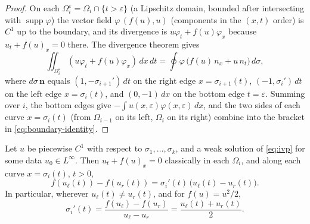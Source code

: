 \begin{proof}
On each $\Omega_i^\varepsilon=\Omega_i\cap\{t>\varepsilon\}$ (a Lipschitz
domain, bounded after intersecting with $\operatorname{supp}\varphi$) the
vector field $\varphi\,(f(u),u)$ (components in the $(x,t)$ order) is $C^1$ up
to the boundary, and its divergence is $u\varphi_t+f(u)\varphi_x$ because
$u_t+f(u)_x=0$ there. The divergence theorem gives
\begin{equation*}
  \iint_{\Omega_i^\varepsilon}(u\varphi_t+f(u)\varphi_x)\,dx\,dt
  = \oint \varphi\,\big(f(u)\,n_x+u\,n_t\big)\,d\sigma ,
\end{equation*}
where $d\sigma\,\mathbf n$ equals $(1,-\sigma_{i+1}')\,dt$ on the right edge
$x=\sigma_{i+1}(t)$, $(-1,\sigma_i')\,dt$ on the left edge $x=\sigma_i(t)$, and
$(0,-1)\,dx$ on the bottom edge $t=\varepsilon$. Summing over $i$, the bottom
edges give $-\int u(x,\varepsilon)\varphi(x,\varepsilon)\,dx$, and the two
sides of each curve $x=\sigma_i(t)$ (from $\Omega_{i-1}$ on its left, $\Omega_i$ on
its right) combine into the bracket in \eqref{eq:boundary-identity}.
\end{proof}

\begin{theorem}
\label{thm:rankine-hugoniot}
Let $u$ be piecewise $C^1$ with respect to $\sigma_1,\dots,\sigma_k$, and a weak
solution of \eqref{eq:ivp} for some data $u_0\in L^\infty$. Then $u_t+f(u)_x=0$
classically in each $\Omega_i$, and along each curve $x=\sigma_i(t)$, $t>0$,
\begin{equation}
  \label{eq:rh-jump}
  f(u_\ell(t)) - f(u_r(t)) = \sigma_i'(t)\,\big(u_\ell(t)-u_r(t)\big).
\end{equation}
In particular, wherever $u_\ell(t)\neq u_r(t)$, and for $f(u)=u^2/2$,
\begin{equation}
  \label{eq:rankine-hugoniot-burgers}
  \sigma_i'(t) = \frac{f(u_\ell) - f(u_r)}{u_\ell - u_r} = \frac{u_\ell(t) + u_r(t)}{2}.
\end{equation}
\end{theorem}

